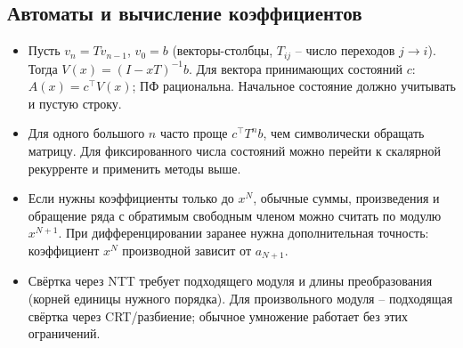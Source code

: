 \subsection{Автоматы и вычисление коэффициентов}
\begin{itemize}[leftmargin=*, nosep]
\item Пусть $v_n=Tv_{n-1}$, $v_0=b$ (векторы-столбцы, $T_{ij}$ -- число переходов $j\to i$). Тогда $V(x)=(I-xT)^{-1}b$. Для вектора принимающих состояний $c$: $A(x)=c^\top V(x)$; ПФ рациональна. Начальное состояние должно учитывать и пустую строку.
\item Для одного большого $n$ часто проще $c^\top T^n b$, чем символически обращать матрицу. Для фиксированного числа состояний можно перейти к скалярной рекурренте и применить методы выше.
\item Если нужны коэффициенты только до $x^N$, обычные суммы, произведения и обращение ряда с обратимым свободным членом можно считать по модулю $x^{N+1}$. При дифференцировании заранее нужна дополнительная точность: коэффициент $x^N$ производной зависит от $a_{N+1}$.
\item Свёртка через NTT требует подходящего модуля и длины преобразования (корней единицы нужного порядка). Для произвольного модуля -- подходящая свёртка через CRT/разбиение; обычное умножение работает без этих ограничений.
\end{itemize}
